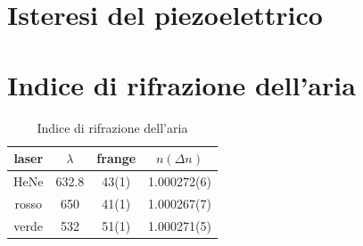 \documentclass[a4paper]{article}
\begin{document}
\section{Isteresi del piezoelettrico}

\section{Indice di rifrazione dell'aria}

\begin{table}[H]
	\centering
	\begin{tabular}{|c|c|c|c|}
		\hline
		laser & $\lambda$ & frange  & $n(\Delta n)$ \\
		\hline
		HeNe & 632.8 & 43(1) &1.000272(6)\\
		rosso & 650 & 41(1) &1.000267(7)\\ 
		verde & 532 & 51(1) &1.000271(5)\\
		\hline
	\end{tabular}
	\caption{Indice di rifrazione dell'aria}
	\label{tab:n}
\end{table}
\end{document}
